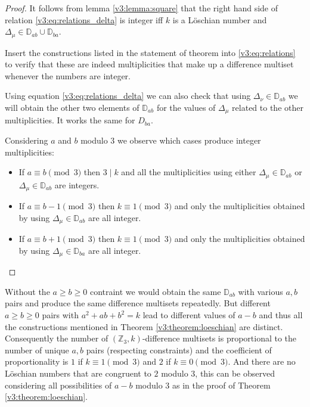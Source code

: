 \begin{proof}
	It follows from lemma \ref{v3:lemma:square} that the right hand side of relation \eqref{v3:eq:relations_delta} is integer iff $k$ is a Löschian number and $\Delta_\mu \in \mathbb D_{ab} \cup \mathbb D_{ba}$.
	
	Insert the constructions listed in the statement of theorem into \eqref{v3:eq:relations} to verify that these are indeed multiplicities that make up a difference multiset whenever the numbers are integer.
	
	Using equation \eqref{v3:eq:relations_delta} we can also check that using $\Delta_\nu \in \mathbb D_{ab}$ we will obtain the other two elements of $\mathbb D_{ab}$ for the values of $\Delta_\mu$ related to the other multiplicities. It works the same for $D_{ba}$.
	
	Considering $a$ and $b$ modulo $3$ we observe which cases produce integer multiplicities:
	\begin{itemize}
		\item If $a \equiv b \pmod 3$ then $3 \mid k$ and all the multiplicities using either $\Delta_\mu \in \mathbb D_{ab}$ or $\Delta_\mu \in \mathbb D_{ab}$ are integers.
		\item If $a \equiv b-1 \pmod 3$ then $k \equiv 1 \pmod 3$ and only the multiplicities obtained by using $\Delta_\mu \in \mathbb D_{ab}$ are all integer.
		\item If $a \equiv b+1 \pmod 3$ then $k \equiv 1 \pmod 3$ and only the multiplicities obtained by using $\Delta_\mu \in \mathbb D_{ba}$ are all integer.
	\end{itemize}
\end{proof}

\begin{remark}
    Without the $a \geq b \geq 0$ contraint we would obtain the same $\mathbb D_{ab}$ with various $a,b$ pairs and produce the same difference multisets repeatedly.	But different $a \geq b \geq 0$ pairs with $a^2+ab+b^2=k$ lead to different values of $a-b$ and thus all the constructions mentioned in Theorem \ref{v3:theorem:loeschian} are distinct. Consequently the number of $(\mathbb Z_3,k)$-difference multisets is proportional to the number of unique $a,b$ pairs (respecting constraints) and the coefficient of proportionality is $1$ if $k\equiv 1\pmod{3}$ and $2$ if $k\equiv 0\pmod{3}$. And there are no Löschian numbers that are congruent to $2$ modulo $3$, this can be observed considering all possibilities of $a-b$ modulo $3$ as in the proof of Theorem \ref{v3:theorem:loeschian}.
\end{remark}

